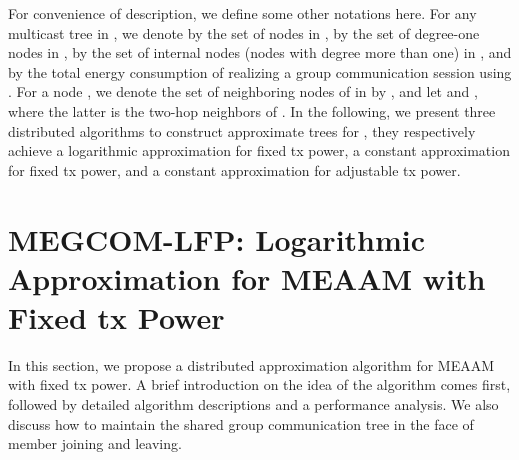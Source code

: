 \documentclass[10pt, conference, compsocconf]{IEEEtran}
\begin{document}
  For convenience of description, we define some other notations here. For any multicast tree  in , we denote by  the set of nodes in , by  the set of degree-one nodes in , by  the set of internal nodes (nodes with degree more than one) in , and by  the total energy consumption of realizing a group communication session using . For a node , we denote the set of neighboring nodes of  in  by , and let  and , where the latter is the two-hop neighbors of . In the following, we present three distributed algorithms to construct approximate trees for , they respectively achieve a logarithmic approximation for fixed tx power, a constant approximation for fixed tx power, and a constant approximation for adjustable tx power.


\section{MEGCOM-LFP: Logarithmic Approximation for MEAAM with Fixed tx Power} \label{sec:logftxp}
In this section, we propose a distributed approximation algorithm for MEAAM with fixed tx power. A brief introduction on the idea of the algorithm comes first, followed by detailed algorithm descriptions and a performance analysis. We also discuss how to maintain the shared group communication tree in the face of member joining and leaving.
\end{document}
